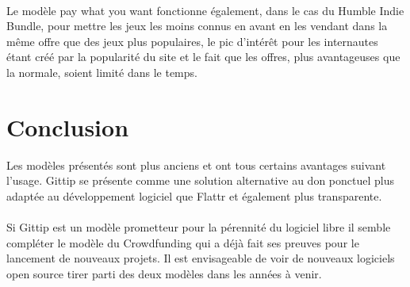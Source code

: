 \paragraph{}
Le modèle pay what you want fonctionne également, dans le cas du Humble Indie
Bundle, pour mettre les jeux les moins connus en avant en les vendant dans la
même offre que des jeux plus populaires, le pic d'intérêt pour les internautes
étant créé par la popularité du site et le fait que les offres, plus
avantageuses que la normale, soient limité dans le temps.

\section{Conclusion}
Les modèles présentés sont plus anciens et ont tous certains avantages suivant
l'usage. Gittip se présente comme une solution alternative au don ponctuel plus
adaptée au développement logiciel que Flattr et également plus transparente.

\paragraph{}
Si Gittip est un modèle prometteur pour la pérennité du logiciel libre il semble
compléter le modèle du Crowdfunding qui a déjà fait ses preuves pour le
lancement de nouveaux projets. Il est envisageable de voir de nouveaux logiciels
open source tirer parti des deux modèles dans les années à venir.
